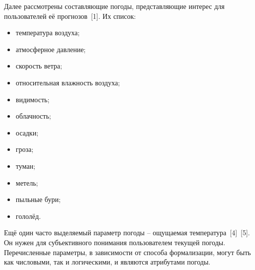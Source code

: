 Далее рассмотрены составляющие погоды, представляющие интерес для пользователей её прогнозов~[1]. 
Их список:
\begin{itemize}
    \item температура воздуха;
    \item атмосферное давление;
    \item скорость ветра;
    \item относительная влажность воздуха;
    \item видимость;
    \item облачность;
    \item осадки;
    \item гроза;
    \item туман;
    \item метель;
    \item пыльные бури;
    \item гололёд.
\end{itemize}
Ещё один часто выделяемый параметр погоды -- ощущаемая температура~[4]~[5].
Он нужен для субъективного понимания пользователем текущей погоды.
Перечисленные параметры, в зависимости от способа формализации, могут быть как числовыми, так и логическими, и являются атрибутами погоды.

